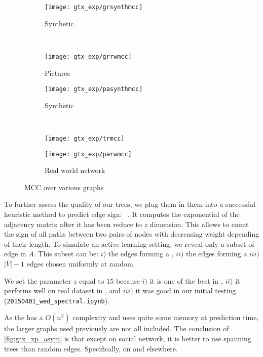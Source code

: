 \begin{figure}[tbh]
	\centering
	\begin{subfigure}[b]{0.47\textwidth}
		\texttt{[image: gtx\_exp/grsynthmcc]}
		\caption{Synthetic \grid{} }\label{fig:gtx_xp_grsynthmcc}
	\end{subfigure}~
	\begin{subfigure}[b]{0.47\textwidth}
		\texttt{[image: gtx\_exp/grrwmcc]}
		\caption{Pictures \grid{} }\label{fig:gtx_xp_grrwmcc}
	\end{subfigure}
	\begin{subfigure}[b]{0.47\textwidth}
		\texttt{[image: gtx\_exp/pasynthmcc]}
		\caption{Synthetic \lpa{} }\label{fig:gtx_xp_pasynthmcc}
	\end{subfigure}~
	\begin{subfigure}[b]{0.47\textwidth}
		\texttt{[image: gtx\_exp/trmcc]}
		\caption{\triangle{} }\label{fig:gtx_xp_trmcc}
	\end{subfigure}
	\begin{subfigure}[b]{0.47\textwidth}
		\texttt{[image: gtx\_exp/parwmcc]}
		\caption{Real world network }\label{fig:gtx_xp_parwmcc}
	\end{subfigure}
	\caption{MCC over various graphs}\label{fig:gtx_xp_mcc}
\end{figure}

To further assess the quality of our trees, we plug them in them into a successful heuristic method
to predict edge sign: \asym{}~\autocite{Kunegis2009}.  It computes the exponential of the adjacency matrix after it has
been reduce to $z$ dimension. This allows to count the sign of all paths between two pairs of nodes
with decreasing weight depending of their length. To simulate an active learning setting, we reveal
only a subset of edge in $A$. This subset can be: $i)$ the edges forming a \bfs{}, $ii)$ the edges
forming a \gtx{} $iii)$ $|V|-1$ edges chosen uniformly at random.

We set the parameter $z$ equal to $15$ because $i)$ it is one of the best in \cite[Fig.
11]{Kunegis2009}, $ii)$ it performs well on real dataset in \cite[Fig.3]{Cesa-Bianchi2012a}, and
$iii)$ it was good in our initial testing (\texttt{20150401\_wed\_spectral.ipynb}).

As the \asym{} has a $O(n^3)$ complexity and uses quite some memory at prediction time, the larger
graphs used previously are not all included. The conclusion of \autoref{fig:gtx_xp_asym} is that
except on social network, it is better to use spanning trees than random edges. Specifically, \gtx{}
on \grid{} and \bfs{} elsewhere.

